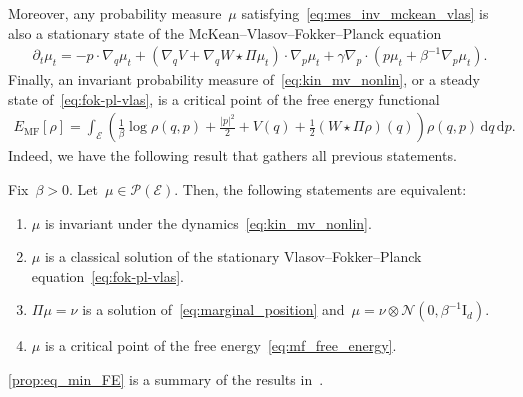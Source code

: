 \documentclass[onefignum,onetabnum]{siamart251216} %
\renewcommand{\d}{\mathrm{d}}
\newcommand{\mc}[1]{\mathcal{#1}}
\newcommand{\mescin}{\mu}
\newcommand{\mespos}{\nu}
\newcommand{\emff}[1]{E_{\mathrm{MF}}\!\left[#1\right]}
\newcommand{\projp}{\Pi}
\theoremstyle{plain}
\numberwithin{equation}{section}
\numberwithin{theorem}{section}
\begin{document}
Moreover, any probability measure~$\mu$ satisfying~\eqref{eq:mes_inv_mckean_vlas} is also a stationary state of the McKean--Vlasov--Fokker--Planck equation
\begin{align}
    \label{eq:fok-pl-vlas}
    \partial_t \mescin_t = -p\cdot\nabla_q\mescin_t + (\nabla_q V+\nabla_q W \star \projp \mescin_t)\cdot\nabla_p \mescin_t + \gamma\nabla_p\cdot\!\left(p \mescin_t + \beta^{-1}\nabla_p\mescin_t\right).
\end{align}
Finally, an invariant probability measure of~\eqref{eq:kin_mv_nonlin}, or a steady state of~\eqref{eq:fok-pl-vlas}, is a critical point of the free energy functional~\cite{Dolbeault_1999}
\begin{align}
    \label{eq:mf_free_energy}
    \emff{\rho} = \int_{\mc{E}} \left(\frac{1}{\beta}\log \rho(q,p) + \frac{|p|^2}{2} + V(q) +  \frac12 ( W \star \projp\rho)(q) \right)\!\rho(q,p)\,\d q \, \d p.
\end{align}
Indeed, we have the following result that gathers all previous statements.
\begin{proposition}
    \label{prop:eq_min_FE}
    Fix~$\beta >0$. Let~$\mescin \in \mc{P}(\mc{E})$. Then, the following statements are equivalent:
    \begin{enumerate}
        \item[(1)] $\mescin$ is invariant under the dynamics~\eqref{eq:kin_mv_nonlin}.
        \item[(2)] $\mescin$ is a classical solution of the stationary Vlasov--Fokker--Planck equation~\eqref{eq:fok-pl-vlas}.
        \item[(3)] $\projp\mescin = \mespos$ is a solution of~\eqref{eq:marginal_position} and~$\mescin = \mespos\otimes\mc{N}(0,\beta^{-1}\text{I}_d)$.
        \item[(4)] $\mescin$ is a critical point of the free energy~\eqref{eq:mf_free_energy}.
    \end{enumerate}
\end{proposition}
\cref{prop:eq_min_FE} is a summary of the results in~\cite{duong2016stationary,duong2017vlasovfokkerplanckequi}.
\end{document}
